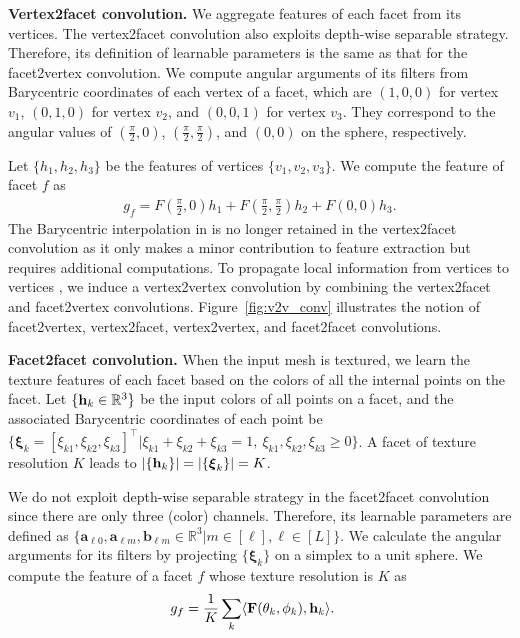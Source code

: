 {\vspace{1mm}
\noindent\textbf{Vertex2facet convolution.} We aggregate features of each facet from its vertices. The vertex2facet convolution also exploits depth-wise separable strategy. Therefore, its definition of learnable parameters is the same as that for the facet2vertex convolution. We compute angular arguments of its filters from Barycentric coordinates of each  vertex of a facet, which are $(1,0,0)$ for vertex $v_1$, $(0,1,0)$ for vertex $v_2$, and $(0,0,1)$ for vertex $v_3$. 
They correspond to the angular values of  $(\frac{\pi}{2},0)$, $(\frac{\pi}{2},\frac{\pi}{2})$, and $(0,0)$ on the sphere, respectively.

Let $\{h_1,h_2,h_3\}$ be the features of vertices $\{v_1,v_2,v_3\}$. We compute the feature of facet $f$ as
\begin{align}
g_f=F(\frac{\pi}{2},0)h_1+
F(\frac{\pi}{2},\frac{\pi}{2}) h_2+F(0,0)h_3.
\label{eq:V2F_Conv}
\end{align}
The Barycentric interpolation in \cite{lei2021picasso} is no longer retained in the vertex2facet convolution 
as it only makes a minor contribution to  feature extraction but requires additional computations.
To propagate local information from vertices to vertices \cite{qi2017pointnet,wu2019pointconv,lei2020spherical}, we induce a vertex2vertex convolution by combining the vertex2facet and facet2vertex convolutions.  
Figure~\ref{fig:v2v_conv} illustrates the notion of facet2vertex, vertex2facet,   vertex2vertex,
and facet2facet convolutions. 

\vspace{1mm}
\noindent\textbf{Facet2facet convolution.}
When the input mesh is textured, we learn the texture features of each facet based on the colors of all the internal points on the facet. 
Let $\{{\bf h}_k\in\mathbb{R}^3\}$ be the input colors of all points on a facet, and the associated Barycentric coordinates of each point be $\{{\boldsymbol\xi}_k=[\xi_{k1},\xi_{k2},\xi_{k3}]^\intercal|\xi_{k1}+\xi_{k2}+\xi_{k3}=1,~\xi_{k1},\xi_{k2},\xi_{k3}\geqslant0\}$. 
A facet of texture resolution $K$ leads to $|\{{\bf h}_k\}|=|\{{\boldsymbol\xi}_k\}|=K$. 

We do not exploit 
depth-wise separable strategy in the facet2facet convolution since there are only three (color) channels. 
Therefore, its learnable parameters are defined as $\{\mathbf{a}_{\ell 0}, \mathbf{a}_{\ell m}, \mathbf{b}_{\ell m}{\in}\mathbb{R}^3|m{\in}[\ell], \ell{\in}[L]\}$. 
We calculate the angular arguments for its filters by projecting $\{{\boldsymbol\xi}_k\}$ on a simplex to a unit sphere. 
We compute the feature of a facet $f$ whose texture resolution is $K$ as
\begin{align}
g_f&=\frac{1}{K}\sum_k \langle{\mathbf{F}(\theta_k,\phi_k),{\bf h}_k}\rangle.
\label{eq:F2F_Conv}
\end{align}

}
